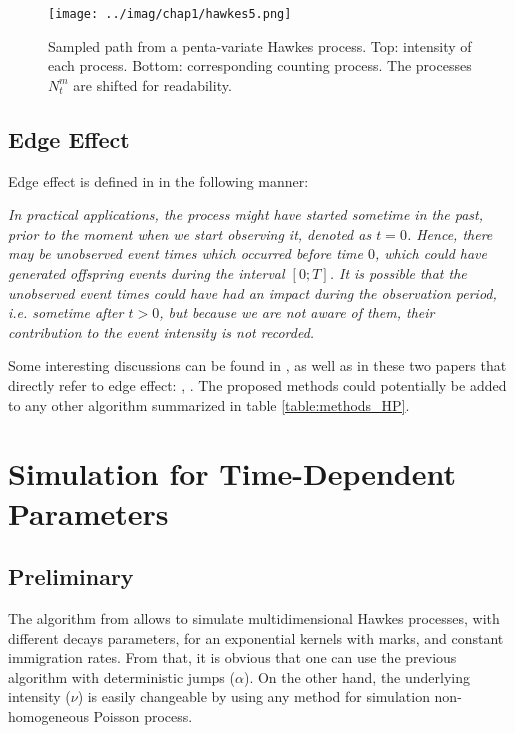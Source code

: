\documentclass[11pt]{book}
\begin{document}
\begin{figure}
\centering
\texttt{[image: ../imag/chap1/hawkes5.png]}
\caption{Sampled path from a penta-variate Hawkes process. Top: intensity of each process. Bottom: corresponding counting process. The processes $N_t^m$ are shifted for readability.}
\label{fig:hawkes5}
\end{figure}

\subsection{Edge Effect}
\label{subsection:edge}
Edge effect is defined in \cite{socialhawkes} in the following manner:

\textit{In practical applications, the process might have started sometime in the past, prior to the moment when we start observing it, denoted as $t = 0$. Hence, there may be unobserved event times which occurred before time $0$, which could have generated offspring events during the interval $[0;T]$. It is possible that the unobserved event times could have had an impact during the observation period, i.e. sometime after $t > 0$, but because we are not aware of them, their contribution to the event intensity is not recorded.}


Some interesting discussions can be found in \cite{daley}, as well as in these two papers that directly refer to edge effect: \cite{cox}, \cite{rasmussen}. The proposed methods could potentially be added to any other algorithm summarized in table \ref{table:methods_HP}.




\section{Simulation for Time-Dependent Parameters}
\subsection{Preliminary}

The algorithm from \cite{my_algo_simul} allows to simulate multidimensional Hawkes processes, with different decays parameters, for an exponential kernels with marks, and constant immigration rates. From that, it is obvious that one can use the previous algorithm with deterministic jumps ($\alpha$). On the other hand, the underlying intensity ($\nu$) is easily changeable by using any method for simulation non-homogeneous Poisson process.
\end{document}
